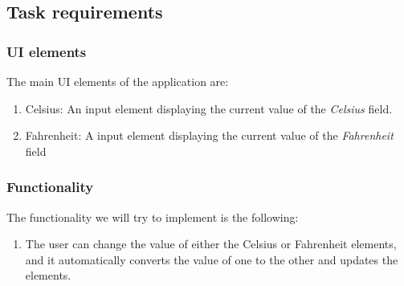 \subsection{Task requirements}
\subsubsection{UI elements}
The main UI elements of the application are:
\begin{enumerate}
	\item Celsius: An input element displaying the current value of the \emph{Celsius} field.
	\item Fahrenheit: A input element displaying the current value of the \emph{Fahrenheit} field
\end{enumerate}

\subsubsection{Functionality}
The functionality we will try to implement is the following:
\begin{enumerate}
	\item The user can change the value of either the Celsius or Fahrenheit elements, and it automatically converts the value of one to the other and updates the elements.
\end{enumerate}
\medskip
